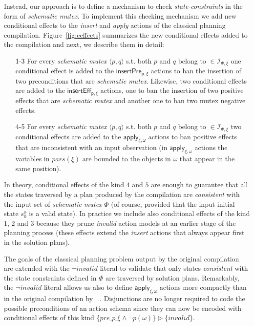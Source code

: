\documentclass{article}
\newcommand{\tup}[1]{{\langle #1 \rangle}}
\begin{document}
Instead, our approach is to define a mechanism to check {\em state-constraints} in the form of {\em schematic mutex}. To implement this checking mechanism we add new conditional effects to the {\em insert} and {\em apply} actions of the classical planning compilation. Figure~\ref{fig:ceffects} summarizes the new conditional effects added to the compilation and next, we describe them in detail:
\begin{enumerate}
\item[1-3] For every {\em schematic mutex} $\tup{p,q}$ s.t. both $p$ and $q$ belong to $\in{\mathcal I}_{\Psi,\xi}$ one conditional effect is added to the $\mathsf{insertPre_{p,\xi}}$ actions to ban the insertion of two preconditions that are {\em schematic mutex}. Likewise, two conditional effects are added to the $\mathsf{insertEff_{p,\xi}}$ actions, one to ban the insertion of two positive effects that are {\em schematic mutex} and another one to ban two mutex negative effects.
\item[4-5] For every {\em schematic mutex} $\tup{p,q}$ s.t. both $p$ and $q$ belong to $\in{\mathcal I}_{\Psi,\xi}$ two conditional effects are added to the $\mathsf{apply_{\xi,\omega}}$ actions to ban positive effects that are inconsistent with an input observation (in $\mathsf{apply_{\xi,\omega}}$ actions the variables in $pars(\xi)$ are bounded to the objects in $\omega$ that appear in the same position).
\end{enumerate}
In theory, conditional effects of the kind $4$ and $5$ are enough to guarantee that all the states traversed by a plan produced by the compilation are {\em consistent} with the input set of {\em schematic mutex} $\Phi$ (of course, provided that the input initial state $s_0^o$ is a valid state). In practice we include also conditional effects of the kind $1$, $2$ and $3$ because they prune {\em invalid} action models at an earlier stage of the planning process (these effects extend the {\em insert} actions that always appear first in the solution plans).

The goals of the classical planning problem output by the original compilation are extended with the $\neg invalid$ literal to validate that only states {\em consistent} with the state constraints defined in $\Phi$ are traversed by solution plans. Remarkably, the $\neg invalid$ literal allows us also to define $\mathsf{apply_{\xi,\omega}}$ actions more compactly than in the original compilation by~\citeauthor{aineto2018learning}~\citeyear{aineto2018learning}. Disjunctions are no longer required to code the possible preconditions of an action schema since they can now be encoded with conditional effects of this kind $\{pre\_p\_\xi\wedge \neg p(\omega)\}\rhd\{invalid\}$.
\end{document}
